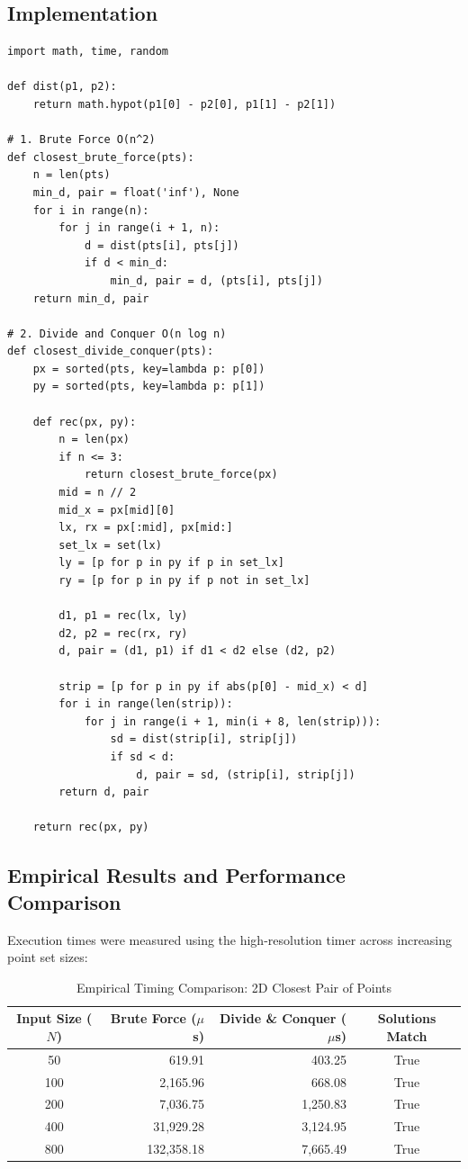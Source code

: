 \documentclass[12pt]{article}
\begin{document}
\subsection{Implementation}
\begin{lstlisting}[style=code]
import math, time, random

def dist(p1, p2):
    return math.hypot(p1[0] - p2[0], p1[1] - p2[1])

# 1. Brute Force O(n^2)
def closest_brute_force(pts):
    n = len(pts)
    min_d, pair = float('inf'), None
    for i in range(n):
        for j in range(i + 1, n):
            d = dist(pts[i], pts[j])
            if d < min_d:
                min_d, pair = d, (pts[i], pts[j])
    return min_d, pair

# 2. Divide and Conquer O(n log n)
def closest_divide_conquer(pts):
    px = sorted(pts, key=lambda p: p[0])
    py = sorted(pts, key=lambda p: p[1])

    def rec(px, py):
        n = len(px)
        if n <= 3:
            return closest_brute_force(px)
        mid = n // 2
        mid_x = px[mid][0]
        lx, rx = px[:mid], px[mid:]
        set_lx = set(lx)
        ly = [p for p in py if p in set_lx]
        ry = [p for p in py if p not in set_lx]

        d1, p1 = rec(lx, ly)
        d2, p2 = rec(rx, ry)
        d, pair = (d1, p1) if d1 < d2 else (d2, p2)

        strip = [p for p in py if abs(p[0] - mid_x) < d]
        for i in range(len(strip)):
            for j in range(i + 1, min(i + 8, len(strip))):
                sd = dist(strip[i], strip[j])
                if sd < d:
                    d, pair = sd, (strip[i], strip[j])
        return d, pair

    return rec(px, py)
\end{lstlisting}

\subsection{Empirical Results and Performance Comparison}
Execution times were measured using the high-resolution timer across increasing point set sizes:

\begin{table}[H]
\centering
\caption{Empirical Timing Comparison: 2D Closest Pair of Points}
\vspace{4pt}
\begin{tabular}{crrc}
\toprule
\textbf{Input Size ($N$)} & \textbf{Brute Force ($\mu$s)} & \textbf{Divide \& Conquer ($\mu$s)} & \textbf{Solutions Match} \\
\midrule
50  & 619.91    & 403.25  & True \\
100 & 2,165.96  & 668.08  & True \\
200 & 7,036.75  & 1,250.83 & True \\
400 & 31,929.28 & 3,124.95 & True \\
800 & 132,358.18& 7,665.49 & True \\
\bottomrule
\end{tabular}
\end{table}
\end{document}
